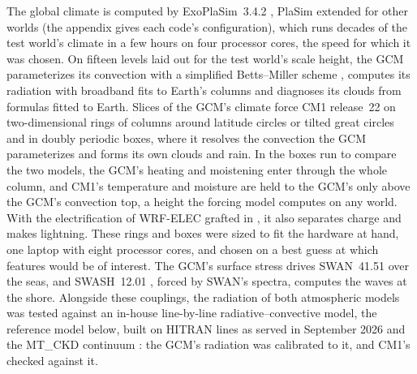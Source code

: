 The global climate is computed by ExoPlaSim~3.4.2 \autocite{paradise2022exoplasim,paradise2025exoplasim}, PlaSim
\autocite{fraedrich2005planet} extended for other worlds (the appendix gives each code's configuration), which runs
decades of the test world's climate in a few hours on four processor cores, the speed for which it was
chosen. On fifteen levels laid out for the test world's scale height, the GCM parameterizes its convection
with a simplified Betts--Miller scheme \autocite{frierson2007dynamics}, computes its radiation with broadband fits to
Earth's columns and diagnoses its clouds from formulas fitted to Earth. Slices of the GCM's
climate force CM1 release~22 \autocite{bryan2002benchmark,bryan2026cm1} on two-dimensional rings of columns around
latitude circles or tilted great circles and in doubly periodic boxes, where it resolves the convection the GCM
parameterizes and forms its own clouds and rain. In the boxes run to compare the two models, the GCM's heating
and moistening enter through the whole column, and CM1's temperature and moisture are held to the GCM's only above
the GCM's convection top, a height the forcing model computes on any world. With the electrification of WRF-ELEC grafted in
\autocite{mansell2010simulated,fierro2013implementation,mansell2026wrfelec}, it also separates charge and makes
lightning. These rings and boxes were sized to fit the hardware at hand, one laptop with eight processor cores,
and chosen on a best guess at which features would be of interest. The GCM's surface stress drives
SWAN~41.51 \autocite{booij1999third,swan4151user} over the seas, and
SWASH~12.01 \autocite{zijlema2011swash,swash1201user}, forced by SWAN's spectra, computes the waves at the shore.
Alongside these couplings, the radiation of both atmospheric models was tested against an in-house line-by-line
radiative--convective model, the reference model below, built on HITRAN lines as served in September 2026
\autocite{gordon2022hitran2020} and the MT\_CKD continuum \autocite{mlawer2012development}: the GCM's radiation
was calibrated to it, and CM1's checked against it.

